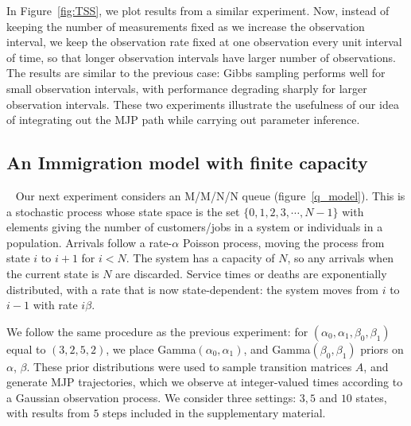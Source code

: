 In Figure~\ref{fig:TSS}, we plot results from a similar experiment. Now,
instead of keeping the number of measurements fixed as we increase the observation
interval, we keep the observation rate fixed at one observation every unit
interval of time, so that longer observation intervals have larger number of 
observations. The results are similar to the previous case: Gibbs sampling
performs well for small observation intervals, with performance degrading
sharply for larger observation intervals. These two experiments illustrate the 
usefulness of our idea of integrating out the MJP path while carrying out
parameter inference.

\subsection{An Immigration model with finite capacity}~
 Our next experiment considers an M/M/N/N queue (figure~\ref{q_model}). This is a stochastic process 
whose state space is the set $\{0, 1, 2, 3, \cdots, N - 1\}$ with elements
giving the number of customers/jobs in a system or individuals in a population. 
Arrivals follow a rate-$\alpha$ Poisson process, moving the process from state 
$i$ to $i+1$ for $i<N$. The system has a capacity of $N$, so any arrivals when 
the current state is $N$ are discarded.  Service times or deaths are 
exponentially distributed, with a rate that is now state-dependent:
the system moves from $i$ to $i - 1$ with rate $i\beta$. 

We follow the same procedure as the previous experiment:
for $(\alpha_0,\alpha_1,\beta_0,\beta_1)$ equal to $(3,2,5,2)$,
we place Gamma$(\alpha_0,\alpha_1)$, and Gamma$(\beta_0, \beta_1)$ priors on 
$\alpha$, $\beta$. These prior distributions were used to sample transition 
matrices $A$, and generate MJP trajectories, which we observe at integer-valued
times according to a Gaussian observation process.
We consider three settings: $3, 5$ and $10$ states, with results from $5$ 
steps included in the supplementary material. 

